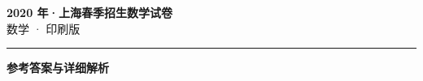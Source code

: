 \documentclass[zihao=5, a4paper]{ctexart}
\begin{document}
\begin{center}
  {\Large\bfseries 2020 年·上海春季招生数学试卷}\\[4pt]
  {\large 数学 · 印刷版}
\end{center}
\medskip
{}

\par\bigskip\hrule\bigskip
{}
\begin{center}{\large\bfseries 参考答案与详细解析}\end{center}
\smallskip

\end{document}
